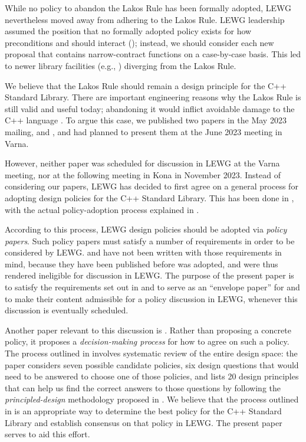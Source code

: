 While no policy to abandon the Lakos Rule has been formally adopted, LEWG nevertheless moved away from adhering to the Lakos Rule. LEWG leadership assumed the position that no formally adopted policy exists for how preconditions and  should interact (\cite{P2920R0}); instead, we should consider each new proposal that contains narrow-contract functions on a case-by-case basis. This led to newer library facilities (e.g., ) diverging from the Lakos Rule.

We believe that the Lakos Rule should remain a design principle for the C++ Standard Library. There are important engineering reasons why the Lakos Rule is still valid and useful today; abandoning it would inflict avoidable damage to the C++ language . To argue this case, we published two papers in the May 2023 mailing, \cite{P2831R0} and \cite{P2861R0}, and had planned to present them at the June 2023 meeting in Varna.

However, neither paper was scheduled for discussion in LEWG at the Varna meeting, nor at the following meeting in Kona in November 2023. Instead of considering our papers, LEWG has decided to first agree on a general process for adopting design policies for the C++ Standard Library. This has been done in \cite{SD-9}, with the actual policy-adoption process explained in \cite{P2267R1}.

According to this process, LEWG design policies should be adopted via \emph{policy papers}. Such policy papers must satisfy a number of requirements in order to be considered by LEWG. \cite{P2831R0} and \cite{P2861R0} have not been written with those requirements in mind, because they have been published before \cite{SD-9} was adopted, and were thus rendered ineligible for discussion in LEWG. The purpose of the present paper is to satisfy the requirements set out in \cite{P2267R1} and to serve as an ``envelope paper'' for \cite{P2831R0} and \cite{P2861R0} to make their content admissible for a  policy discussion in LEWG, whenever this discussion is eventually scheduled.

Another paper relevant to this discussion is \cite{P3005R0}. Rather than proposing a concrete  policy, it proposes a \emph{decision-making process} for how to agree on such a policy. The process outlined in \cite{P3005R0} involves systematic review of the entire design space: the paper considers seven possible candidate  policies, six design questions that would need to be answered to choose one of those policies, and lists 20 design principles that can help us find the correct answers to those questions by following the \emph{principled-design} methodology proposed in \cite{P3004R0}. We believe that the process outlined in \cite{P3005R0} is an appropriate way to determine the best policy for the C++ Standard Library and establish consensus on that policy in LEWG. The present paper serves to aid this effort.

